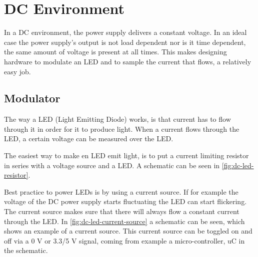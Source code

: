 
\section{DC Environment}
\label{sec:dc-environment}

In a DC environment, the power supply delivers a constant voltage.
In an ideal case the power supply's output is not load dependent nor is it time dependent, the same amount of voltage is present at all times.
This makes designing hardware to modulate an LED and to sample the current that flows, a relatively easy job.

\subsection{Modulator}

The way a LED (Light Emitting Diode) works, is that current has to flow through it in order for it to produce light.
When a current flows through the LED, a certain voltage can be measured over the LED.

The easiest way to make en LED emit light, is to put a current limiting resistor in series with a voltage source and a LED.
A schematic can be seen in \autoref{fig:dc-led-resistor}.

Best practice to power LEDs is by using a current source. 
If for example the voltage of the DC power supply starts fluctuating the LED can start flickering.
The current source makes sure that there will always flow a constant current through the LED.
In \autoref{fig:dc-led-current-source} a schematic can be seen, which shows an example of a current source.
This current source can be toggled on and off via a 0 V or 3.3/5 V signal, coming from example a micro-controller, uC in the schematic.


